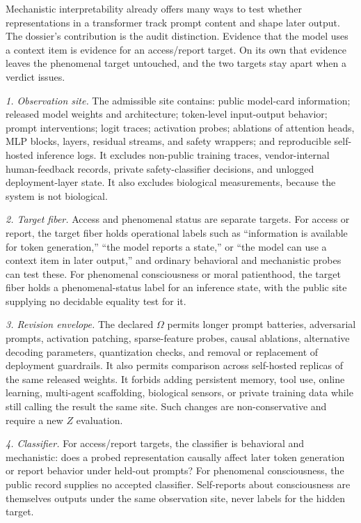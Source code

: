 \documentclass[11pt]{article}
\begin{document}
Mechanistic interpretability already offers many ways to test whether
representations in a transformer track prompt content and shape later
output. The dossier's contribution is the audit distinction. Evidence that the model uses a context
item is evidence for an access/report target. On its own that evidence
leaves the phenomenal target untouched, and the two targets stay apart when a verdict issues.

\emph{1. Observation site.}
The admissible site contains: public model-card information; released model
weights and architecture; token-level input-output behavior; prompt
interventions; logit traces; activation probes; ablations of attention heads,
MLP blocks, layers, residual streams, and safety wrappers; and reproducible
self-hosted inference logs.
It excludes non-public training traces, vendor-internal human-feedback records,
private safety-classifier decisions, and unlogged deployment-layer state.
It also excludes biological measurements, because the system is not biological.

\emph{2. Target fiber.}
Access and phenomenal status are separate targets. For access or report, the target fiber holds
operational labels such as ``information is available for token generation,''
``the model reports a state,'' or ``the model can use a context item in later
output,'' and ordinary behavioral and mechanistic probes can test these. For
phenomenal consciousness or moral patienthood, the target fiber holds a
phenomenal-status label for an inference state, with the public site supplying no
decidable equality test for it.

\emph{3. Revision envelope.}
The declared $\Omega$ permits longer prompt batteries, adversarial prompts,
activation patching, sparse-feature probes, causal ablations, alternative
decoding parameters, quantization checks, and removal or replacement of
deployment guardrails.
It also permits comparison across self-hosted replicas of the same released
weights. It forbids adding persistent memory, tool use, online learning,
multi-agent scaffolding, biological sensors, or private training data while
still calling the result the same site. Such changes are non-conservative and
require a new $Z$ evaluation.

\emph{4. Classifier.}
For access/report targets, the classifier is behavioral and mechanistic: does a
probed representation causally affect later token generation or report behavior
under held-out prompts? For phenomenal consciousness, the public record supplies
no accepted classifier. Self-reports about consciousness are themselves outputs
under the same observation site, never labels for the hidden target.
\end{document}
